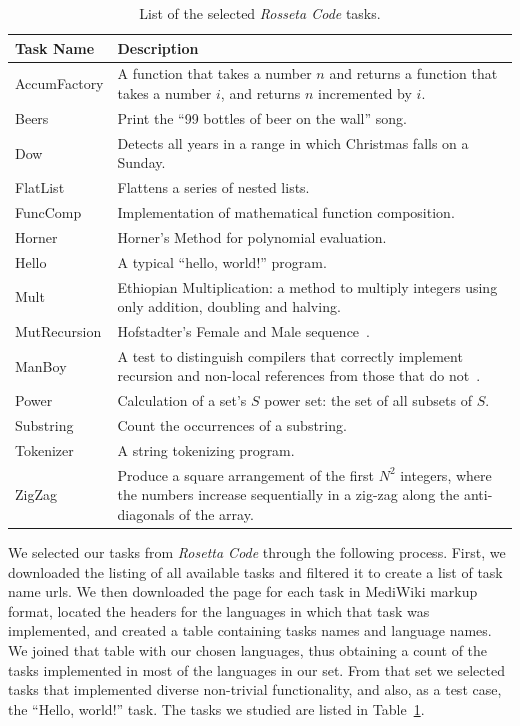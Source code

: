 \documentclass[10pt]{sigplanconf}
\begin{document}
\begin{table}
\begin{center}
\begin{tabular}{ l p{5cm}}
Task Name & Description\\
\hline
AccumFactory & A function that takes a number $n$ and returns a function that takes a number $i$,
and returns $n$ incremented by $i$. \\
Beers & Print the ``99 bottles of beer on the wall'' song.\\
Dow & Detects all years in a range in which Christmas falls on a Sunday.\\
FlatList & Flattens a series of nested lists.\\
FuncComp & Implementation of mathematical function composition.\\
Horner & Horner's Method for polynomial evaluation.\\
Hello & A typical ``hello, world!'' program.\\
Mult & Ethiopian Multiplication: a method to multiply integers using only addition, doubling and halving.\\
MutRecursion & Hofstadter's Female and Male sequence~\cite{Hof89}.\\
ManBoy & A test to distinguish compilers that correctly implement
recursion and non-local references from those that do not~\cite{Knu64}.  \\
Power & Calculation of a set's $S$ power set: the set of all subsets of $S$.\\
Substring & Count the occurrences of a substring.\\
Tokenizer & A string tokenizing program.\\
ZigZag & Produce a square arrangement of the first $N^2$ integers,
where the numbers increase sequentially in a zig-zag along the anti-diagonals of the array.\\
\end{tabular}
\end{center}
\caption{List of the selected {\em Rosseta Code} tasks.}
\label{tab:tasks}
\end{table}

We selected our tasks from {\em Rosetta Code} through the following process.
First, we downloaded the listing of all available tasks and
filtered it to create a list of task name {\sc url}s.
We then downloaded the page for each task in MediWiki markup format,
located the headers for the languages in which that task was implemented, and
created a table containing tasks names and language names.
We joined that table with our chosen languages,
thus obtaining a count of the tasks implemented in
most of the languages in our set.
From that set we selected tasks that implemented diverse
non-trivial functionality,
and also, as a test case, the ``Hello, world!'' task.
The tasks we studied are listed in Table~\ref{tab:tasks}.
\end{document}
